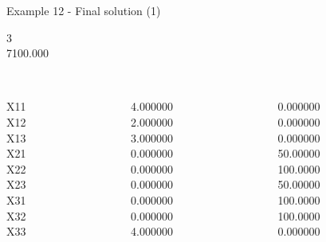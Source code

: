\begin{frame}{Example 12 - Final solution (1)}

\footnotesize
{}  3\\
  7100.000\\

\begin{columns}[t]
\begin{column}{0.3\textwidth}
\\
X11\\
X12\\
X13\\
X21\\
X22\\
X23\\
X31\\
X32\\
X33\\
\end{column}
\begin{column}{0.3\textwidth}
\\
4.000000\\
2.000000\\
3.000000\\
0.000000\\
0.000000\\
0.000000\\
0.000000\\
0.000000\\
4.000000\\

\end{column}

\begin{column}{0.3\textwidth}
\\
0.000000\\
0.000000\\
0.000000\\
50.00000\\
100.0000\\
50.00000\\
100.0000\\
100.0000\\
0.000000\\
\end{column}
\end{columns}
\end{frame}


